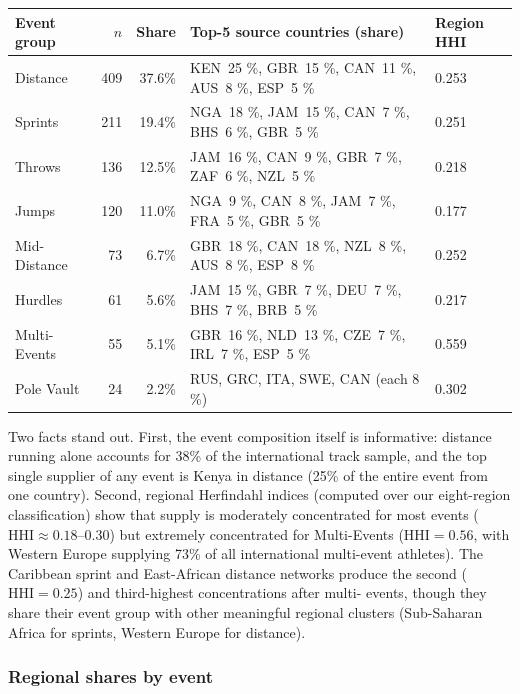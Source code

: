\documentclass[11pt]{article}
\begin{document}
\begin{center}
\small
\begin{tabular}{lrrll}
\toprule
Event group   & $n$ & Share & Top-5 source countries (share) & Region HHI \\
\midrule
Distance      & 409 & 37.6\%  & KEN~25 \%, GBR~15 \%, CAN~11 \%, AUS~8 \%, ESP~5 \% & 0.253 \\
Sprints       & 211 & 19.4\%  & NGA~18 \%, JAM~15 \%, CAN~7 \%, BHS~6 \%, GBR~5 \% & 0.251 \\
Throws        & 136 & 12.5\%  & JAM~16 \%, CAN~9 \%, GBR~7 \%, ZAF~6 \%, NZL~5 \% & 0.218 \\
Jumps         & 120 & 11.0\%  & NGA~9 \%,  CAN~8 \%, JAM~7 \%, FRA~5 \%, GBR~5 \% & 0.177 \\
Mid-Distance  &  73 &  6.7\%  & GBR~18 \%, CAN~18 \%, NZL~8 \%, AUS~8 \%, ESP~8 \% & 0.252 \\
Hurdles       &  61 &  5.6\%  & JAM~15 \%, GBR~7 \%, DEU~7 \%, BHS~7 \%, BRB~5 \% & 0.217 \\
Multi-Events  &  55 &  5.1\%  & GBR~16 \%, NLD~13 \%, CZE~7 \%, IRL~7 \%, ESP~5 \% & 0.559 \\
Pole Vault    &  24 &  2.2\%  & RUS, GRC, ITA, SWE, CAN (each 8 \%)              & 0.302 \\
\bottomrule
\end{tabular}
\end{center}

Two facts stand out. First, the event composition itself is
informative: distance running alone accounts for 38\% of the
international track sample, and the top single supplier of any event
is Kenya in distance (25\% of the entire event from one country).
Second, regional Herfindahl indices (computed over our eight-region
classification) show that supply is moderately concentrated for most
events ($\text{HHI} \approx 0.18$--$0.30$) but extremely concentrated
for Multi-Events ($\text{HHI} = 0.56$, with Western Europe supplying
73\% of all international multi-event athletes). The Caribbean
sprint and East-African distance networks produce the second
($\text{HHI}=0.25$) and third-highest concentrations after multi-
events, though they share their event group with other meaningful
regional clusters (Sub-Saharan Africa for sprints, Western Europe
for distance).

\subsubsection*{Regional shares by event}
\end{document}
